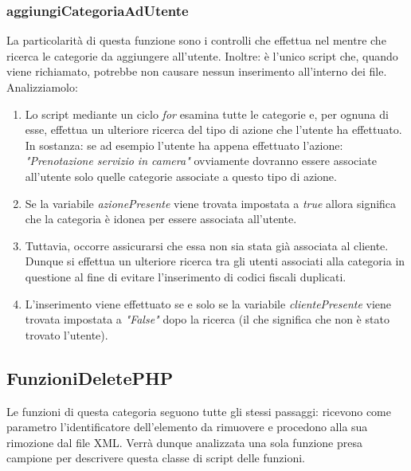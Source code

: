 \documentclass [a4paper, 12pt]{book}
\begin{document}
\subsubsection{aggiungiCategoriaAdUtente}
La particolarità di questa funzione sono i controlli che effettua nel mentre che ricerca le categorie da aggiungere all'utente. Inoltre: è l'unico script che, quando viene richiamato, potrebbe non causare nessun inserimento all'interno dei file. Analizziamolo:
\begin{enumerate}
\item Lo script mediante un ciclo \textit{for} esamina tutte le categorie e, per ognuna di esse, effettua un ulteriore ricerca del tipo di azione che l'utente ha effettuato. In sostanza: se ad esempio l'utente ha appena effettuato l'azione: \textit{"Prenotazione servizio in camera"} ovviamente dovranno essere associate all'utente solo quelle categorie associate a questo tipo di azione. 
\item Se la variabile \textit{azionePresente} viene trovata impostata a \textit{true} allora significa che la categoria è idonea per essere associata all'utente.
\item Tuttavia, occorre assicurarsi che essa non sia stata già associata al cliente. Dunque si effettua un ulteriore ricerca tra gli utenti associati alla categoria in questione al fine di evitare l'inserimento di codici fiscali duplicati.
\item L'inserimento viene effettuato se e solo se la variabile \textit{clientePresente} viene trovata impostata a \textit{"False"} dopo la ricerca (il che significa che non è stato trovato l'utente).
\end{enumerate} 


\subsection{FunzioniDeletePHP}
Le funzioni di questa categoria seguono tutte gli stessi passaggi: ricevono come parametro l'identificatore dell'elemento da rimuovere e procedono alla sua rimozione dal file XML. Verrà dunque analizzata una sola funzione presa campione per descrivere questa classe di script delle funzioni.
\end{document}
